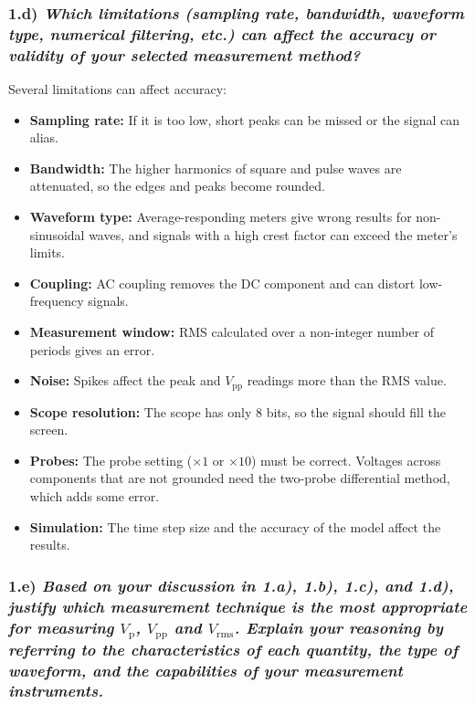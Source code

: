 \subsubsection*{1.d) \normalfont\itshape Which limitations (sampling rate, bandwidth, waveform type, numerical filtering, etc.) can affect the accuracy or validity of your selected measurement method?}

Several limitations can affect accuracy:
\begin{itemize}
    \item \textbf{Sampling rate:} If it is too low, short peaks can be missed or the signal can alias.
    \item \textbf{Bandwidth:} The higher harmonics of square and pulse waves are attenuated, so the edges and peaks become rounded.
    \item \textbf{Waveform type:} Average-responding meters give wrong results for non-sinusoidal waves, and signals with a high crest factor can exceed the meter's limits.
    \item \textbf{Coupling:} AC coupling removes the DC component and can distort low-frequency signals.
    \item \textbf{Measurement window:} RMS calculated over a non-integer number of periods gives an error.
    \item \textbf{Noise:} Spikes affect the peak and $V_{\mathrm{pp}}$ readings more than the RMS value.
    \item \textbf{Scope resolution:} The scope has only 8 bits, so the signal should fill the screen.
    \item \textbf{Probes:} The probe setting ($\times 1$ or $\times 10$) must be correct. Voltages across components that are not grounded need the two-probe differential method, which adds some error.
    \item \textbf{Simulation:} The time step size and the accuracy of the model affect the results.
\end{itemize}

\subsubsection*{1.e) \normalfont\itshape Based on your discussion in 1.a), 1.b), 1.c), and 1.d), justify which measurement technique is the most appropriate for measuring $V_\mathrm{p}$, $V_{\mathrm{pp}}$ and $V_{\mathrm{rms}}$.
                                        Explain your reasoning by referring to the characteristics of each quantity, the type of waveform, and the capabilities of your measurement instruments.}

